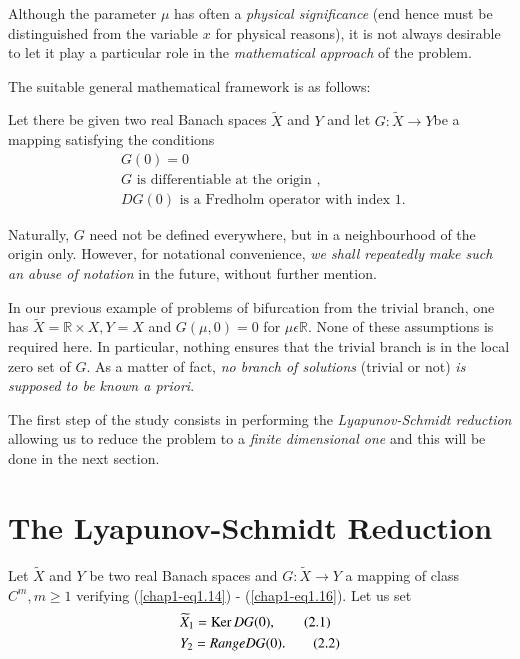 Although the parameter $\mu$ has often a {\em physical significance} (end hence must be distinguished from the variable $x$ for physical reasons), it is not always desirable to let it play a particular role in the {\em mathematical approach} of the problem.

The suitable general mathematical framework is as follows:

Let there be given two real Banach spaces $\widetilde{X}$ and $Y$ and let $G : \widetilde{X} \to Y$\pageoriginale be a mapping satisfying the conditions
\begin{align*}
& G(0) = 0\tag{1.14}\label{chap1-eq1.14}\\
& G \text{ is differentiable at the origin },\tag{1.15}\label{chap1-eq1.15}\\
& DG(0) \text{ is a Fredholm operator with index 1. }\tag{1.16}\label{chap1-eq1.16}
\end{align*}

Naturally, $G$ need not be defined everywhere, but in a neighbourhood of the origin only. However, for notational convenience, {\em we shall repeatedly make such an abuse of notation} in the future, without further mention.

In our previous example of problems of bifurcation from the trivial branch, one has $\widetilde{X} = \mathbb{R} \times X, Y = X$ and $G(\mu, 0) = 0$ for $\mu \epsilon \mathbb{R}$. None of these assumptions is required here. In particular, nothing ensures that the trivial branch is in the local zero set of $G$. As a matter of fact, {\em no branch of solutions} (trivial or not) {\em is supposed to be known a priori}.

The first step of the study consists in performing the {\em Lyapunov-Schmidt reduction} allowing us to reduce the problem to a {\em finite dimensional one} and this will be done in the next section.

\section{The Lyapunov-Schmidt Reduction}\label{chap1-sec2}

Let $\widetilde{X}$ and $Y$ be two real Banach spaces and $G : \widetilde{X} \to Y$ a mapping of class $C^{m}, m \geq 1$ verifying (\ref{chap1-eq1.14}) - (\ref{chap1-eq1.16}). Let us set
\begin{align*}
& \widetilde{X}_{1} = \operatorname{Ker} DG(0),\tag{2.1}\label{chap1-eq2.1}\\
& Y_{2} = Range DG(0).\tag{2.2}\label{chap1-eq2.2}
\end{align*}\pageoriginale

